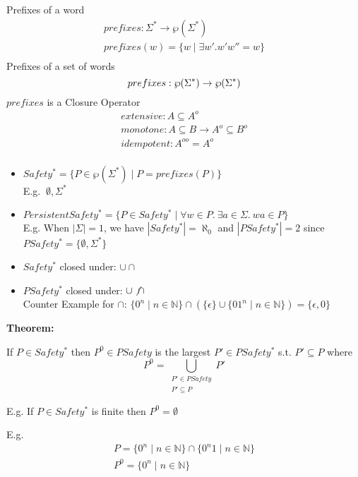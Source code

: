 \documentclass{report}
\begin{document}
Prefixes of a word
\[
\begin{array}{l}
prefixes : \Sigma^* \to \wp(\Sigma^*)\\
prefixes(w) = \{w \mid \exists w' . w'w''=w\}\\
\end{array}
\]
Prefixes of a set of words
$$
prefixes : \wp(\Sigma^*) \to \wp(\Sigma^*)\\
$$
\hspace{10pt}
$prefixes$ is a Closure Operator
$$
\begin{array}{l}
extensive : A \subseteq A^o\\
monotone: A \subseteq B \to A^o \subseteq B^o\\
idempotent: A^{oo} = A^o\\
\end{array}
$$

\newpage

\begin{itemize}
\item $Safety^* = \{P \in \wp(\Sigma^*)\mid P = prefixes(P)\}$\\
E.g. $\ \emptyset, \Sigma^*$

\item $PersistentSafety^* = \{P \in Safety^* \mid \forall w \in P.\ \exists a\in\Sigma.\ wa\in P\}$\\
E.g. When $|\Sigma| = 1$, we have $|Safety^*| = \aleph_0$ and $|PSafety^*| = 2$ since $PSafety^* = \{\emptyset, \Sigma^*\}$

  \item $Safety^*$  closed under: $\cup \cap$
  \item $PSafety^*$ closed under: $\cup \not\cap$\\
  Counter Example for $\cap$:
  $\{0^n \mid n \in \mathbb{N}\} \cap (\{\epsilon\}\cup\{01^n \mid n \in \mathbb{N}\}) = \{\epsilon, 0\}$
  
\end{itemize}

\noindent
\textbf{Theorem:}

If $P \in Safety^*$ then $P^0 \in PSafety$ is the largest $P' \in PSafety^*$ s.t. $P' \subseteq P$
where
$$
P^0 = \bigcup_{\substack{P' \in PSafety \\ P'\subseteq P}} P'
$$

E.g. If $P \in Safety^*$ is finite then $P^0 = \emptyset$


E.g.
$$
\begin{array}{l}
P = \{0^n \mid n \in \mathbb{N}\} \cap \{0^n1 \mid n \in \mathbb{N}\} \\
P^0 = \{0^n \mid n \in \mathbb{N}\}
\end{array}
$$
\end{document}
